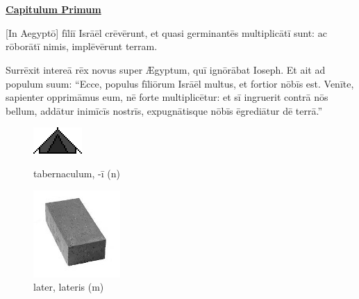 \chapter{}



{\begin{center}\large\bf\underline{Capitulum Primum}\end{center}%

[In Aegyptō] fīliī Isrāēl crēvērunt, et quasi germinantēs multiplicātī sunt:
ac rōborātī nimis, implēvērunt terram.

Surrēxit intereā rēx novus super Ægyptum, quī ignōrābat Ioseph.
Et ait ad populum suum: ``Ecce, populus fīliōrum Isrāēl multus, et fortior nōbīs est.
Venīte, sapienter opprimāmus eum, nē forte multiplicētur: et sī ingruerit contrā nōs bellum, addātur inimīcīs nostrīs, expugnātisque nōbīs ēgrediātur dē terrā.''

\begin{figure}[h]
    \begin{minipage}[h]{0.5\linewidth}
        \centering
        \includegraphics{tab}
        \caption{tabernaculum, -ī (n)}
    \end{minipage}%
    \begin{minipage}[h]{0.5\linewidth}
        \vspace*{-0.3cm}
        \centering
        \includegraphics{later}
        \vspace*{-0.425cm}
        \caption{later, lateris (m)}
    \end{minipage}
\end{figure}

}
